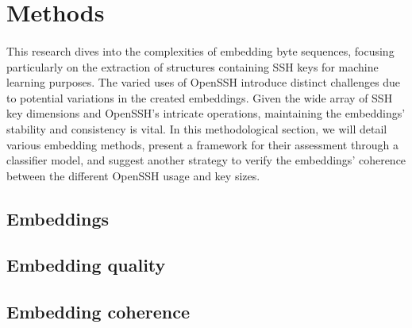 \section{Methods}\label{chap:methods}
    \paragraph{}This research dives into the complexities of embedding byte sequences, focusing particularly on the extraction of structures containing SSH keys for machine learning purposes. The varied uses of OpenSSH introduce distinct challenges due to potential variations in the created embeddings. Given the wide array of SSH key dimensions and OpenSSH's intricate operations, maintaining the embeddings' stability and consistency is vital. In this methodological section, we will detail various embedding methods, present a framework for their assessment through a classifier model, and suggest another strategy to verify the embeddings' coherence between the different OpenSSH usage and key sizes.


    \subsection{Embeddings}


    \subsection{Embedding quality}


    \subsection{Embedding coherence}